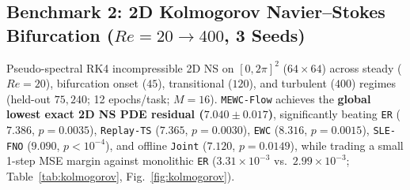 \documentclass[11pt,a4paper]{article}
\begin{document}
\FloatBarrier
\subsection{Benchmark 2: 2D Kolmogorov Navier--Stokes Bifurcation ($Re=20 \to 400$, 3 Seeds)}

Pseudo-spectral RK4 incompressible 2D NS on $[0, 2\pi]^2$ ($64\times 64$) across steady ($Re=20$), bifurcation onset ($45$), transitional ($120$), and turbulent ($400$) regimes (held-out $75, 240$; 12 epochs/task; $M=16$). \texttt{MEWC-Flow} achieves the \textbf{global lowest exact 2D NS PDE residual ($7.040 \pm 0.017$)}, significantly beating \texttt{ER} ($7.386$, $p=0.0035$), \texttt{Replay-TS} ($7.365$, $p=0.0030$), \texttt{EWC} ($8.316$, $p=0.0015$), \texttt{SLE-FNO} ($9.090$, $p<10^{-4}$), and offline \texttt{Joint} ($7.120$, $p=0.0149$), while trading a small 1-step MSE margin against monolithic \texttt{ER} ($3.31\times 10^{-3}$ vs.\ $2.99\times 10^{-3}$; Table~\ref{tab:kolmogorov}, Fig.~\ref{fig:kolmogorov}).
\end{document}
